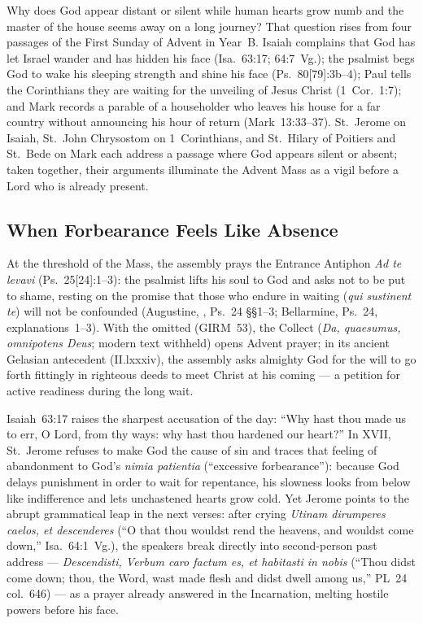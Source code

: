 
Why does God appear distant or silent while human hearts grow numb and the master of the house seems away on a long journey? That question rises from four passages of the First Sunday of Advent in Year~B. Isaiah complains that God has let Israel wander and has hidden his face (Isa.~63:17; 64:7~Vg.); the psalmist begs God to wake his sleeping strength and shine his face (Ps.~80[79]:3b--4); Paul tells the Corinthians they are waiting for the unveiling of Jesus Christ (1~Cor.~1:7); and Mark records a parable of a householder who leaves his house for a far country without announcing his hour of return (Mark~13:33--37). St.~Jerome on Isaiah, St.~John Chrysostom on 1~Corinthians, and St.~Hilary of Poitiers and St.~Bede on Mark each address a passage where God appears silent or absent; taken together, their arguments illuminate the Advent Mass as a vigil before a Lord who is already present.

\subsection{When Forbearance Feels Like Absence}

At the threshold of the Mass, the assembly prays the Entrance Antiphon \emph{Ad te levavi} (Ps.~25[24]:1--3): the psalmist lifts his soul to God and asks not to be put to shame, resting on the promise that those who endure in waiting (\emph{qui sustinent te}) will not be confounded (Augustine, , Ps.~24 §§1--3; Bellarmine, Ps.~24, explanations~1--3). With the  omitted (GIRM~53), the Collect (\emph{Da, quaesumus, omnipotens Deus}; modern text withheld) opens Advent prayer; in its ancient Gelasian antecedent (II.lxxxiv), the assembly asks almighty God for the will to go forth fittingly in righteous deeds to meet Christ at his coming --- a petition for active readiness during the long wait.

Isaiah~63:17 raises the sharpest accusation of the day: ``Why hast thou made us to err, O Lord, from thy ways: why hast thou hardened our heart?'' In  XVII, St.~Jerome refuses to make God the cause of sin and traces that feeling of abandonment to God's \emph{nimia patientia} (``excessive forbearance''): because God delays punishment in order to wait for repentance, his slowness looks from below like indifference and lets unchastened hearts grow cold. Yet Jerome points to the abrupt grammatical leap in the next verses: after crying \emph{Utinam dirumperes caelos, et descenderes} (``O that thou wouldst rend the heavens, and wouldst come down,'' Isa.~64:1~Vg.), the speakers break directly into second-person past address --- \emph{Descendisti, Verbum caro factum es, et habitasti in nobis} (``Thou didst come down; thou, the Word, wast made flesh and didst dwell among us,'' PL~24 col.~646) --- as a prayer already answered in the Incarnation, melting hostile powers before his face.

